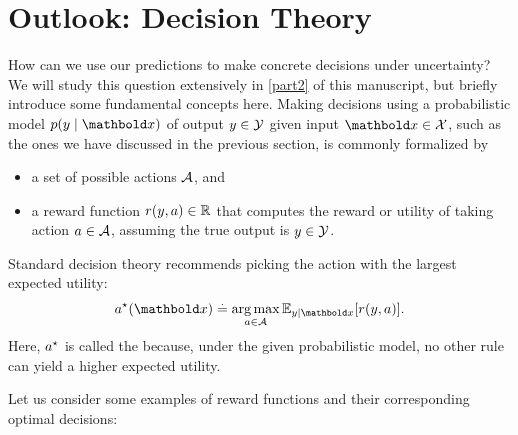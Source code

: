 \section{Outlook: Decision Theory}\label{sec:decision_theory}

How can we use our predictions to make concrete decisions under uncertainty?
We will study this question extensively in \cref{part2} of this manuscript, but briefly introduce some fundamental concepts here.
Making decisions using a probabilistic model $p(y \mid \vx)$ of output $y \in \mathcal{Y}$ given input $\vx \in \spX$, such as the ones we have discussed in the previous section, is commonly formalized by \begin{itemize}
  \item a set of possible actions $\mathcal{A}$, and
  \item a reward function $r(y, a) \in \mathbb{R}$ that computes the reward or utility of taking action ${a \in \mathcal{A}}$, assuming the true output is ${y \in \mathcal{Y}}$.
\end{itemize}
Standard decision theory recommends picking the action with the largest expected utility: \begin{align}
  \opt{a}(\vx) \defeq \argmax_{a \in \spA} \E[y \mid \vx]{r(y, a)}. \label{eq:decision_theory}
\end{align}
Here, $a^\star$ is called the  because, under the given probabilistic model, no other rule can yield a higher expected utility.

Let us consider some examples of reward functions and their corresponding optimal decisions:


